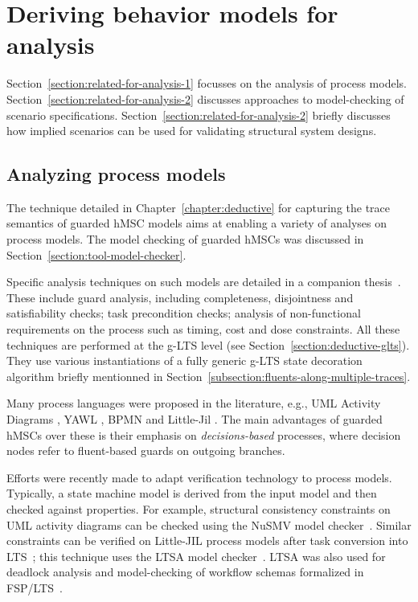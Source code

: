 \section{Deriving behavior models for analysis\label{section:related-for-analysis}}

Section~\ref{section:related-for-analysis-1} focusses on the analysis of process models. Section~\ref{section:related-for-analysis-2} discusses approaches to model-checking of scenario specifications. Section~\ref{section:related-for-analysis-2} briefly discusses how implied scenarios can be used for validating structural system designs.


\subsection{Analyzing process models\label{section:related-for-analysis-1}}

The technique detailed in Chapter~\ref{chapter:deductive} for capturing the trace semantics of guarded hMSC models aims at enabling a variety of analyses on process models. The model checking of guarded hMSCs was discussed in Section~\ref{section:tool-model-checker}. 

Specific analysis techniques on such models are detailed in a companion thesis~\cite{Damas:2011}. These include guard analysis, including completeness, disjointness and satisfiability checks; task precondition checks; analysis of non-functional requirements on the process such as timing, cost and dose constraints. All these techniques are performed at the g-LTS level (see Section~\ref{section:deductive-glts}). They use various instantiations of a fully generic g-LTS state decoration algorithm briefly mentionned in Section~\ref{subsection:fluents-along-multiple-traces}.

Many process languages were proposed in the literature, e.g., UML Activity Diagrams \cite{OMG:2004}, YAWL \cite{Vanderaalst:2005}, BPMN \cite{OMG:2008} and Little-Jil \cite{Clarke:2008}. The main advantages of guarded hMSCs over these is their emphasis on \emph{decisions-based} processes, where decision nodes refer to fluent-based guards on outgoing branches.

Efforts were recently made to adapt verification technology to process models. Typically, a state machine model is derived from the input model and then checked against properties. For example, structural consistency constraints on UML activity diagrams can be checked using the NuSMV model checker~\cite{Eshuis:2006}. Similar constraints can be verified on Little-JIL process models after task conversion into LTS~\cite{Lerner:2004}; this technique uses the LTSA model checker~\cite{Magee:1999}. LTSA was also used for deadlock analysis and model-checking of workflow schemas formalized in FSP/LTS~\cite{Karamanolis:2000}.

